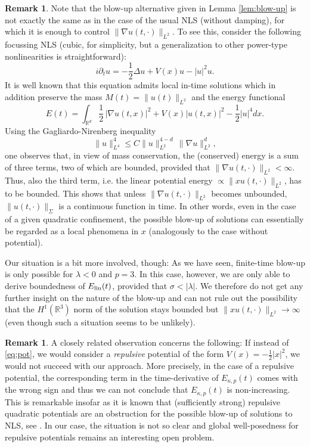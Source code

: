 \documentclass[a4paper,leqno]{amsart}
\theoremstyle{plain}
\theoremstyle{definition}
\newtheorem{remark}[theorem]{Remark}
\numberwithin{equation}{section}
\begin{document}
\begin{remark} \label{rem: blow-up} Note that the blow-up alternative given in Lemma \ref{lem:blow-up} is not exactly the same as in the case of the usual NLS (without damping), 
for which it is enough to control $ \|\nabla u(t, \cdot)\|_{L^2}$. 
To see this, consider the following focussing NLS (cubic, for simplicity, but a generalization to other power-type nonlinearities is straightforward):
\begin{equation*}
i{\partial}_t u =- {\frac{1}{2}}\Delta u +V(x) u -  |u |^2 u .
\end{equation*}
It is well known that this equation admits local in-time solutions which in addition preserve the mass $M(t)= \|u(t)\|_{L^2}$ and the energy functional 
$$
E (t)=\int_{{{\mathbb R}}^d}\frac{1}{2}\, |\nabla u(t,x)|^2+ V(x) |u(t,x)|^2 - \frac{ 1}{2} |u |^4 d x.
$$
Using the Gagliardo-Nirenberg inequality
\begin{equation*}
 \lVert u \rVert_{L^4}^4 {\leqslant} C  \lVert u \rVert_{L^2}^{4-d} \, \lVert
 \nabla u
 \rVert_{L^2}^d,
\end{equation*}
one observes that, in view of mass conservation, the (conserved) energy is a sum of three terms, two of which are bounded, provided that $ \|\nabla u(t, \cdot)\|_{L^2}< \infty$. 
Thus, also the third term, i.e. the linear potential energy $\propto  \|x u(t, \cdot)\|_{L^2}$, has to be bounded. This shows that unless $\lVert \nabla
u (t, \cdot) \rVert_{L^2}$ becomes unbounded, $\| u (t, \cdot)\|_{\Sigma}$ is a
continuous function in time. In other words, even in the case of a given quadratic confinement, the possible blow-up of solutions can essentially be regarded as a local phenomena in $x$ 
(analogously to the case without potential).

Our situation is a bit more involved, though: As we have seen, finite-time blow-up is only possible for $\lambda <0$ and $p= 3$. 
In this case, however, we are only able to derive boundedness of $E_{\rm lin}(t)$, provided that $\sigma < |\lambda|$. We therefore do not get any further insight on the nature of the blow-up and 
can not rule out the possibility that the $H^1({{\mathbb R}}^3)$ norm of the solution stays bounded but $\| x u (t, \cdot)\|_{L^2} \to  \infty$ (even though such a situation seems to be unlikely).
\end{remark}

\begin{remark} A closely related observation concerns the following: If instead of \eqref{eq:pot}, we would consider a \emph{repulsive} potential of the form $V(x) = - \frac{1}{2} |x|^2$,
we would not succeed with our approach. More precisely, in the case of a repulsive potential,
the corresponding term in the time-derivative of $E_{\kappa, p}(t)$ comes with the wrong sign and thus we can not conclude that $E_{\kappa,p}(t)$ is non-increasing.
This is remarkable insofar as it is known that (sufficiently strong) repulsive quadratic potentials are an obstruction for the possible blow-up of solutions to NLS, see \cite{Carles}. 
In our case, the situation is not so clear and global well-posedness for repulsive potentials remains an interesting open problem.
\end{remark}
\end{document}
